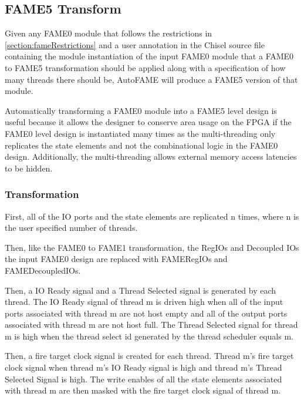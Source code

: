 \subsection{FAME5 Transform}
Given any FAME0 module that follows the restrictions in \ref{section:fameRestrictions} and a user annotation in the Chisel source file containing the module instantiation of the input FAME0 module that a FAME0 to FAME5 transformation should be applied along with a specification of how many threads there should be, AutoFAME will produce a FAME5 version of that module.

Automatically transforming a FAME0 module into a FAME5 level design is useful because it allows the designer to conserve area usage on the FPGA if the FAME0 level design is instantiated many times as the multi-threading only replicates the state elements and not the combinational logic in the FAME0 design. Additionally, the multi-threading allows external memory access latencies to be hidden.

\subsubsection{Transformation}
First, all of the IO ports and the state elements are replicated n times, where n is the user specified number of threads.

Then, like the FAME0 to FAME1 transformation, the RegIOs and Decoupled IOs the input FAME0 design are replaced with FAMERegIOs and FAMEDecoupledIOs.

Then, a IO Ready signal and a Thread Selected signal is generated by each thread. The IO Ready signal of thread m is driven high when all of the input ports associated with thread m are not host empty and all of the output ports associated with thread m are not host full. The Thread Selected signal for thread m is high when the thread select id generated by the thread scheduler equals m.

Then, a fire target clock signal is created for each thread. Thread m's fire target clock signal when thread m's IO Ready signal is high and thread m's Thread Selected Signal is high. The write enables of all the state elements associated with thread m are then masked with the fire target clock signal of thread m.


